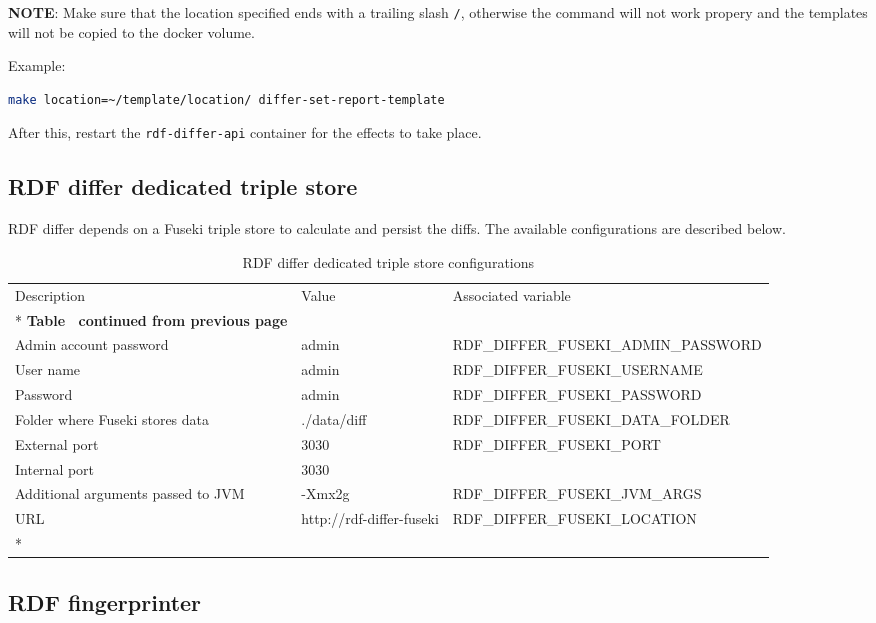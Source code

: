 		\textbf{NOTE}: Make sure that the location specified ends with a trailing slash \texttt{/}, otherwise the command will not work propery and the templates will not be copied to the docker volume.

		Example:
		\begin{lstlisting}[language=bash]
make location=~/template/location/ differ-set-report-template
		\end{lstlisting}

		After this, restart the \texttt{rdf-differ-api} container for the effects to take place.

	
	\subsection{RDF differ dedicated triple store}
	
	RDF differ depends on a Fuseki triple store to calculate and persist the diffs. The available configurations are described below. 

	\begin{longtable}[c]{@{}p{4cm}p{2cm}l@{}}
		\toprule
		Description & Value & Associated variable \\* \midrule
		\endfirsthead
		\multicolumn{3}{c}%
		{{\bfseries Table \thetable\ continued from previous page}} \\
		\endhead
		\bottomrule
		\endfoot
		\endlastfoot
		Admin account password & admin & RDF\_DIFFER\_FUSEKI\_ADMIN\_PASSWORD \\
		User name & admin & RDF\_DIFFER\_FUSEKI\_USERNAME \\
		Password & admin & RDF\_DIFFER\_FUSEKI\_PASSWORD \\
		Folder where Fuseki stores data & ./data/diff & RDF\_DIFFER\_FUSEKI\_DATA\_FOLDER \\
		External port & 3030 & RDF\_DIFFER\_FUSEKI\_PORT \\
		Internal port & 3030 &  \\
		Additional arguments passed to JVM & -Xmx2g & RDF\_DIFFER\_FUSEKI\_JVM\_ARGS \\
		URL & http://rdf-differ-fuseki & RDF\_DIFFER\_FUSEKI\_LOCATION \\* \bottomrule
		\caption{RDF differ dedicated triple store configurations}
		\label{tab:my-table2}\\
	\end{longtable}
	
	\subsection{RDF fingerprinter}
	
